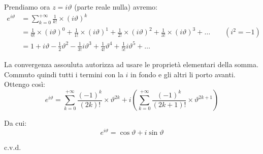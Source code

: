 \documentclass[../../dimostrazioni]{subfiles}
\begin{document}
                Prendiamo ora \( z = i\vartheta \) (parte reale nulla) avremo:
                \begin{align*}
                    e^{i\vartheta}  &=  \sum_{k=0}^{+\infty} \frac{1}{k!} \times (i\vartheta)^k \\
                    &= \frac{1}{0!} \times (i\vartheta)^0 + \frac{1}{1!} \times (i\vartheta)^1 + \frac{1}{2!} \times (i\vartheta)^2 +  \frac{1}{3!} \times (i\vartheta)^3 + \dots  \qquad (i^2 = -1)\\
                    &= 1 + i\vartheta - \frac{1}{2}\vartheta^2 - \frac{1}{3!}i\vartheta^3 + \frac{1}{4!}\vartheta^4 + \frac{1}{5!}i\vartheta^5 + \dots
                \end{align*}
                
                La convergenza assouluta autorizza ad usare le proprietà elementari della somma. 
                Commuto quindi tutti i termini con la \(i\) in fondo e gli altri li porto avanti. Ottengo così:
                \[  e^{i\vartheta} =\sum_{k=0}^{+\infty} \frac{(-1)^k}{(2k)!} \times \vartheta^{2k} + i\left(\sum_{k=0}^{+\infty} \frac{(-1)^k}{(2k+1)!} \times \vartheta^{2k+1}  \right)\]

                Da cui:
                \[ e^{i\vartheta} = \cos \vartheta + i \sin \vartheta \]

                c.v.d.
\end{document}
